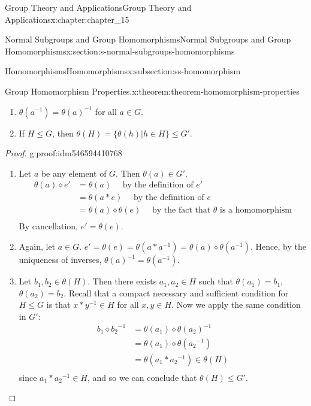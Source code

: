 \documentclass[oneside,10pt,]{book}
\numberwithin{equation}{section}
\begin{document}
\begin{chapterptx}{Group Theory and Applications}{}{Group Theory and Applications}{}{}{x:chapter:chapter_15}
\begin{sectionptx}{Normal Subgroups and Group Homomorphisms}{}{Normal Subgroups and Group Homomorphisms}{}{}{x:section:s-normal-subgroups-homomorphisms}
\begin{subsectionptx}{Homomorphisms}{}{Homomorphisms}{}{}{x:subsection:ss-homomorphism}
\begin{theorem}{Group Homomorphism Properties.}{}{x:theorem:theorem-homomorphism-properties}
\begin{enumerate}[label=(\alph*)]
\item{}\(\theta\left(a ^{-1}\right) = \theta(a)^{-1}\) for all \(a \in  G\).%
\item{}If \(H \leq  G\), then \(\theta(H) = \{\theta(h) | h\in H\}\leq G'\).%
\end{enumerate}
%
\end{theorem}
\begin{proof}{}{g:proof:idm546594410768}
%
\begin{enumerate}[label=(\alph*)]
\item{}Let \(a\) be any element of \(G\). Then \(\theta(a) \in  G'\).%
\begin{equation*}
\begin{split}
\theta(a)\diamond e' &= \theta(a) \quad \textrm{     by the definition of } e'\\
&=\theta(a*e)\quad \textrm{     by the definition of } e\\
&= \theta(a)\diamond \theta(e)\quad \textrm{    by the fact that } \theta \textrm{ is a homomorphism}\\
\end{split}
\end{equation*}
By cancellation, \(e' = \theta(e)\).%
\item{}Again, let \(a \in G\). \(e' = \theta(e) = \theta\left(a*a^{-1} \right) = \theta(a)\diamond \theta\left(a^{-1}\right)\). Hence, by the uniqueness of inverses,  \(\theta(a) ^{-1}= \theta\left(a^{-1}\right)\).%
\item{}Let \(b_1, b_2 \in  \theta(H)\). Then there exists \(a_1, a_2\in H\) such that \(\theta\left(a_1\right) = b_1\), \(\theta\left(a_2\right) =
b_2\). Recall that a compact necessary and sufficient condition for \(H \leq  G\) is that \(x*y^{-1}\in H\)  for all \(x, y \in H\).  Now we apply the same condition in \(G'\):%
\begin{equation*}
\begin{split}
b_1\diamond b_2{}^{-1} &= \theta\left(a_1\right)\diamond \theta\left(a_2\right){}^{-1}\\
& =\theta\left(a_1\right)\diamond \theta\left(a_2{}^{-1}\right)\\
& =\theta\left(a_1*a_2{}^{-1}\right)\in \theta(H)\\
\end{split}
\end{equation*}
since  \(a_1*a_2{}^{-1}\in H\), and so we can conclude that  \(\theta(H)\leq G'\).%
\end{enumerate}
%
\end{proof}

\end{subsectionptx}
\end{sectionptx}
\end{chapterptx}
\end{document}
